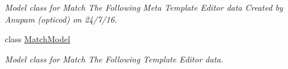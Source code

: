 \begin{DoxyCompactItemize}
\begin{DoxyCompactList}\small\item\em Model class for Match The Following Meta Template Editor data Created by Anupam (opticod) on 24/7/16. \end{DoxyCompactList}\item 
class \hyperlink{classorg_1_1buildmlearn_1_1matchtemplate_1_1data_1_1MatchModel}{Match\+Model}
\begin{DoxyCompactList}\small\item\em Model class for Match The Following Template Editor data. \end{DoxyCompactList}\end{DoxyCompactItemize}
